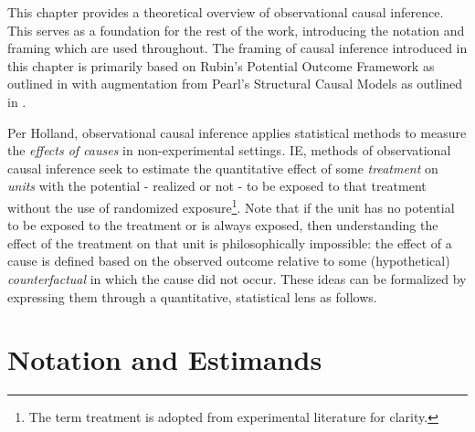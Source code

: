 \documentclass[../main.tex]{subfiles}
\begin{document}
This chapter provides a theoretical overview of observational causal inference. This serves as a foundation for the rest of the work, introducing the notation and framing which are used throughout. The framing of causal inference introduced in this chapter is primarily based on Rubin’s Potential Outcome Framework as outlined in \textcite{Holland1986StatisticsInference} with augmentation from Pearl’s Structural Causal Models as outlined in \textcite{Pearl2009CausalOverview}.\par

\vspace{\baselineskip}
Per Holland, observational causal inference applies statistical methods to measure the \textit{effects of causes} in non-experimental settings\textit{. }IE, methods of observational causal inference seek to estimate the quantitative effect of some \textit{treatment }on \textit{units} with the potential - realized or not - to be exposed to that treatment without the use of randomized exposure\footnote{ The term treatment is adopted from experimental literature for clarity. }. Note that if the unit has no potential to be exposed to the treatment or is always exposed, then understanding the effect of the treatment on that unit is philosophically impossible: the effect of a cause is defined based on the observed outcome relative to some (hypothetical) \textit{counterfactual }in which the cause did not occur. These ideas can be formalized by expressing them through a quantitative, statistical lens as follows.\par

\section{Notation and Estimands}
\end{document}
